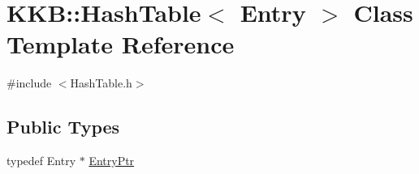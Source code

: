 \hypertarget{class_k_k_b_1_1_hash_table}{}\section{K\+KB\+:\+:Hash\+Table$<$ Entry $>$ Class Template Reference}
\label{class_k_k_b_1_1_hash_table}


{\ttfamily \#include $<$Hash\+Table.\+h$>$}

\subsection*{Public Types}
\begin{DoxyCompactItemize}
\item 
typedef Entry $\ast$ \hyperlink{class_k_k_b_1_1_hash_table_ac2ea7aefb6917165187d622e5dad2563}{Entry\+Ptr}
\end{DoxyCompactItemize}
